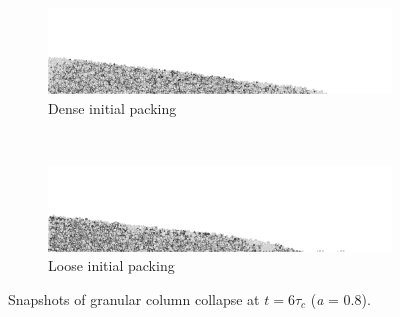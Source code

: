 \begin{figure}[bhp]
\centering
\begin{subfigure}[b]{\textwidth}
\centering
\includegraphics[width=\textwidth]{dense_a08_r6_final}
\caption{Dense initial packing}
\label{fig:dense_a08_r6_final}
\end{subfigure}
\\
\begin{subfigure}[b]{\textwidth}
\centering
\includegraphics[width=\textwidth]{loose_a08_r6_final}
\caption{Loose initial packing}
\label{fig:loose_a08_r6_final}
\end{subfigure}
\caption{Snapshots of granular column collapse at $t = 6 \tau_c$ (\textit{a} = 
0.8).}
\label{fig:density_r6}
\end{figure}


